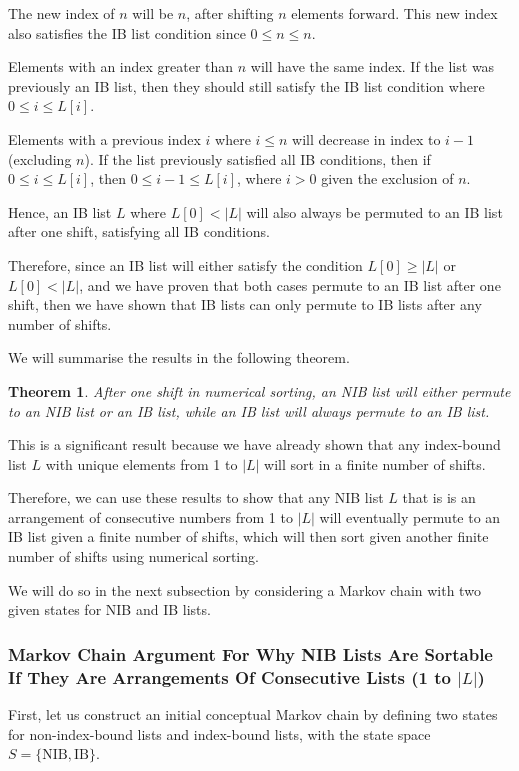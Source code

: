 \documentclass[12pt]{article}
\newtheorem{theorem}{Theorem}[section]
\begin{document}
The new index of $n$ will be $n$, after shifting $n$ elements forward. This new index also satisfies the IB list condition since $0 \leq n \leq n$.

Elements with an index greater than $n$ will have the same index. If the list was previously an IB list, then they should still satisfy the IB list condition where $0 \leq i \leq L[i]$.

Elements with a previous index $i$ where $i \leq n$ will decrease in index to $i-1$ (excluding $n$). If the list previously satisfied all IB conditions, then if $0 \leq i \leq L[i]$, then $0 \leq i-1 \leq L[i]$, where $i>0$ given the exclusion of $n$.

Hence, an IB list $L$ where $L[0] < |L|$ will also always be permuted to an IB list after one shift, satisfying all IB conditions.

Therefore, since an IB list will either satisfy the condition $L[0] \geq |L|$ or $L[0] < |L|$, and we have proven that both cases permute to an IB list after one shift, then we have shown that IB lists can only permute to IB lists after any number of shifts.

We will summarise the results in the following theorem.

\begin{theorem}
 After one shift in numerical sorting, an NIB list will either permute to an NIB list or an IB list, while an IB list will always permute to an IB list.
\end{theorem}

This is a significant result because we have already shown that any index-bound list $L$ with unique elements from 1 to $|L|$ will sort in a finite number of shifts.

Therefore, we can use these results to show that any NIB list $L$ that is is an arrangement of consecutive numbers from 1 to $|L|$ will eventually permute to an IB list given a finite number of shifts, which will then sort given another finite number of shifts using numerical sorting.

We will do so in the next subsection by considering a Markov chain with two given states for NIB and IB lists.

\subsubsection{Markov Chain Argument For Why NIB Lists Are Sortable If They Are Arrangements Of Consecutive Lists (1 to $|L|$)}

First, let us construct an initial conceptual Markov chain by defining two states for non-index-bound lists and index-bound lists, with the state space $S = \{\text{NIB}, \text{IB}\}$.
\end{document}
